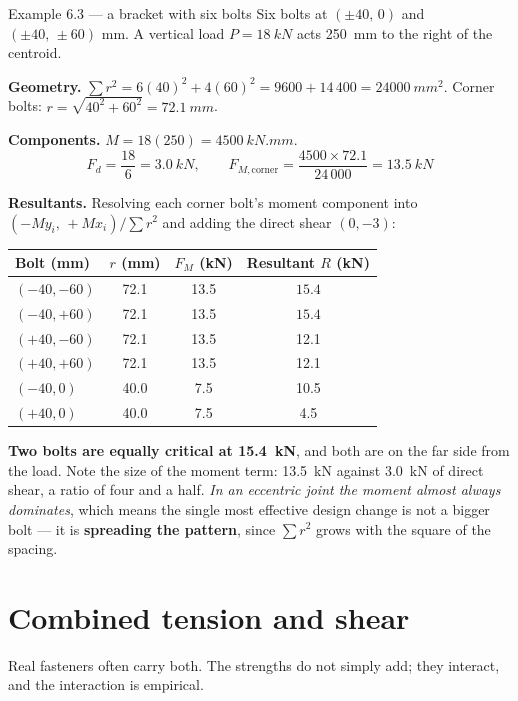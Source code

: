 \documentclass[11pt,a4paper]{article}
\begin{document}
\begin{examplebox}{Example 6.3 --- a bracket with six bolts}
Six bolts at $(\pm40,\,0)$ and $(\pm40,\,\pm60)$ \si{mm}. A vertical load $P=\SI{18}{kN}$ acts
\SI{250}{mm} to the right of the centroid.

\medskip
\textbf{Geometry.} $\sum r^2 = 6(40)^2+4(60)^2 = 9600+14\,400=\SI{24000}{mm^2}$.
Corner bolts: $r=\sqrt{40^2+60^2}=\SI{72.1}{mm}$.

\medskip
\textbf{Components.} $M=18(250)=\SI{4500}{kN.mm}$.
\[
F_d=\frac{18}{6}=\SI{3.0}{kN},
\qquad
F_{M,\text{corner}}=\frac{4500\times72.1}{24\,000}=\SI{13.5}{kN}
\]

\textbf{Resultants.} Resolving each corner bolt's moment component into
$(-My_i,\,+Mx_i)/\sum r^2$ and adding the direct shear $(0,-3)$:

\begin{center}\small
\begin{tabular}{@{}lccc@{}}
\toprule
Bolt (mm) & $r$ (mm) & $F_M$ (kN) & Resultant $R$ (kN)\\
\midrule
$(-40,-60)$ & 72.1 & 13.5 & $\mathbf{15.4}$\\
$(-40,+60)$ & 72.1 & 13.5 & $\mathbf{15.4}$\\
$(+40,-60)$ & 72.1 & 13.5 & 12.1\\
$(+40,+60)$ & 72.1 & 13.5 & 12.1\\
$(-40,0)$ & 40.0 & 7.5 & 10.5\\
$(+40,0)$ & 40.0 & 7.5 & 4.5\\
\bottomrule
\end{tabular}
\end{center}

\medskip
\textbf{Two bolts are equally critical at \SI{15.4}{kN}}, and both are on the far side from the
load. Note the size of the moment term: \SI{13.5}{kN} against \SI{3.0}{kN} of direct shear, a ratio
of four and a half. \emph{In an eccentric joint the moment almost always dominates}, which means the
single most effective design change is not a bigger bolt --- it is \textbf{spreading the pattern},
since $\sum r^2$ grows with the square of the spacing.
\end{examplebox}

\section{Combined tension and shear}
\label{sec:combined}

Real fasteners often carry both. The strengths do not simply add; they interact, and the
interaction is empirical.
\end{document}
